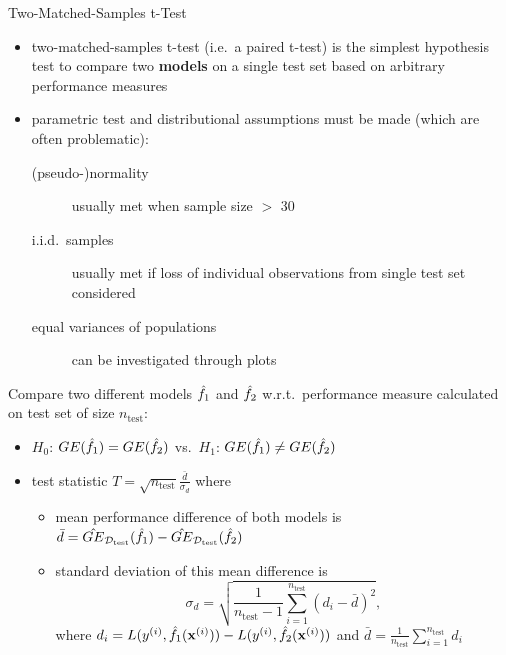     \begin{frame}[c,allowframebreaks]{Two-Matched-Samples t-Test}

        \begin{itemize}
            \item two-matched-samples t-test (i.e.\ a paired t-test) is the simplest
                hypothesis test to compare two \textbf{models} on a single
                test set based on arbitrary performance measures
            \item parametric test and distributional assumptions must be made
                (which are often problematic):
                \begin{description}
                \item[(pseudo-)normality] usually met when sample size $>$ 30
                \item[i.i.d.\ samples] usually met if loss of individual observations from single test set considered
                \item[equal variances of populations] can be investigated through plots
                \end{description}
        \end{itemize}

    \framebreak

    Compare two different models $\hat{f}_1$ and $\hat{f}_2$ w.r.t.\ performance measure calculated on test set of size $n_{\text{test}}$:

    \begin{itemize}
    \item $H_0$: $GE(\hat{f}_{1}) = GE(\hat{f}_{2})$ vs.\ $H_1$: $GE(\hat{f}_{1}) \neq GE(\hat{f}_{2})$
    \item test statistic $T = \sqrt{n_{\text{test}}}
        \frac{\bar{d}}{\sigma_{d}}$ where
    \begin{itemize}
    \item mean performance difference of both models is
        $\bar{d} = \hat{GE}_{\mathcal{D}_{\text{test}}}(\hat{f}_{1}) - \hat{GE}_{\mathcal{D}_{\text{test}}}(\hat{f}_{2})$
    \item standard deviation of this mean difference is
    $$\sigma_{d} = \sqrt{\frac{1}{n_{\text{test}} - 1}\sum_{i=1}^{n_{\text{test}}} \left(d_i - \bar{d} \right)^2},$$
    where $d_i = L(y^{(i)}, \hat{f}_1 (\mathbf{x}^{(i)})) - L(y^{(i)}, \hat{f}_2 (\mathbf{x}^{(i)}))$ and $\bar{d} = \frac{1}{n_{\text{test}}}\sum\limits_{i=1}^{n_{\text{test}}} d_i$
    \end{itemize}
    \end{itemize}


\end{frame}
